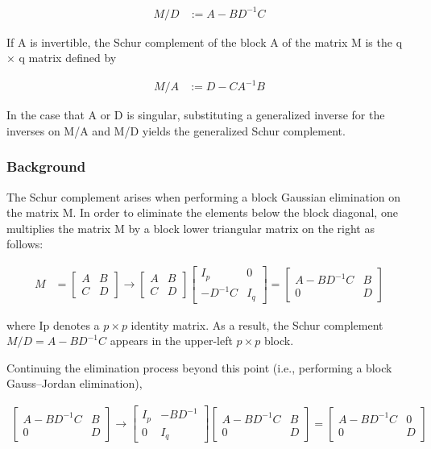 \documentclass[11pt]{article} %
\begin{document}
\begin{align*}
	M/D &:= A - B D^{-1} C
\end{align*}

If A is invertible, the Schur complement of the block A of the matrix M is the q × q matrix defined by

\begin{align*}
	M/A &:= D - C A^{-1} B
\end{align*}

In the case that A or D is singular, substituting a generalized inverse for the inverses on M/A and M/D yields the generalized Schur complement.

\subsubsection{Background}

The Schur complement arises when performing a block Gaussian elimination on the matrix M. In order to eliminate the elements below the block diagonal, one multiplies the matrix M by a block lower triangular matrix on the right as follows:

\begin{align*}
	M &= \begin{bmatrix}
		A & B \\
		C & D
	\end{bmatrix} \rightarrow \begin{bmatrix}
	A & B \\
	C & D
\end{bmatrix} \begin{bmatrix}
I_{p} & 0 \\
-D^{-1}C & I_{q}
\end{bmatrix} = \begin{bmatrix}
A - BD^{-1}C & B \\
0 & D
\end{bmatrix}
\end{align*}

where Ip denotes a $p \times p$ identity matrix. As a result, the Schur complement $ M/D=A-BD^{-1}C$ appears in the upper-left $p \times p$ block.

Continuing the elimination process beyond this point (i.e., performing a block Gauss–Jordan elimination),

\begin{align*}
\begin{bmatrix}
		A - BD^{-1}C & B \\
		0 & D
	\end{bmatrix} \rightarrow \begin{bmatrix}
	I_{p} & -BD^{-1} \\
	0 & I_{q}
\end{bmatrix} \begin{bmatrix}
A - BD^{-1}C & B \\
0 & D
\end{bmatrix} = \begin{bmatrix}
A - BD^{-1}C & 0 \\
0 & D
\end{bmatrix} 
\end{align*}
\end{document}
